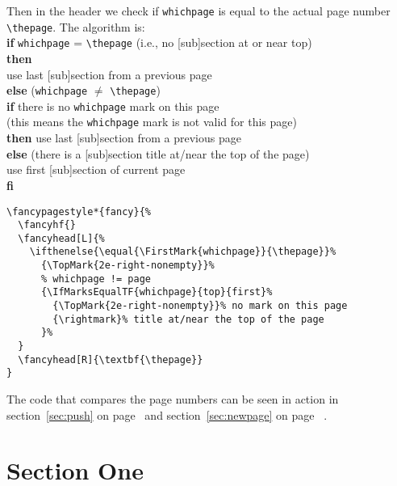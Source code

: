 \documentclass{article}
\begin{document}
\noindent
\begin{boxedminipage}{\textwidth}
Then in the header we check if \texttt{whichpage} is equal to the actual page number \verb|\thepage|. The algorithm is:\\[1ex]
%
\textbf{if} \texttt{whichpage} = \verb|\thepage| (i.e., no [sub]section at or near top)\\
\textbf{then}\\
\hspace*{2em} use last [sub]section from a previous page\\
\textbf{else} (\texttt{whichpage} $\ne$ \verb|\thepage|)\\
\hspace*{2em} \textbf{if} there is no \texttt{whichpage} mark on this page\\
\hspace*{3em} (this means the  \texttt{whichpage} mark is not valid for this page)\\
\hspace*{2em} \textbf{then} use last [sub]section from a previous page\\
\hspace*{2em} \textbf{else} (there is a [sub]section title at/near the top of the page)\\
\hspace*{3em} use first [sub]section of current page\\
\textbf{fi}

\begin{verbatim}
\fancypagestyle*{fancy}{%
  \fancyhf{}
  \fancyhead[L]{%
    \ifthenelse{\equal{\FirstMark{whichpage}}{\thepage}}%
      {\TopMark{2e-right-nonempty}}%
      % whichpage != page
      {\IfMarksEqualTF{whichpage}{top}{first}%
        {\TopMark{2e-right-nonempty}}% no mark on this page
        {\rightmark}% title at/near the top of the page
      }%
  }
  \fancyhead[R]{\textbf{\thepage}}
}
\end{verbatim}

The code that compares the page numbers can be seen in action in section~\ref{sec:push} on page~\pageref{sec:push} and section~\ref{sec:newpage} on page~ \pageref{sec:newpage}.
\end{boxedminipage}

\newpage
\pagestyle{fancy}

\section{Section One}
\end{document}
